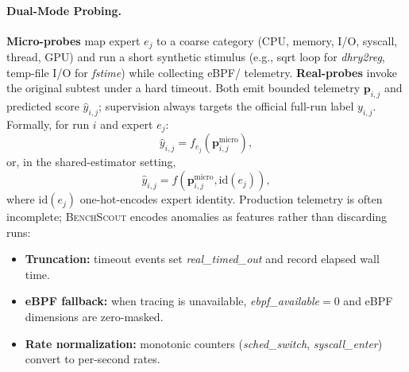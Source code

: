 \documentclass[sigplan,10pt]{acmart}
\newcommand{\ourmethod}{\textsc{BenchScout}\xspace}
\newcommand{\id}[1]{{\itshape #1}}
\begin{document}
\paragraph{Dual-Mode Probing.}
\textbf{Micro-probes} map expert $e_j$ to a coarse category (CPU, memory, I/O, syscall, thread, GPU) and run a short synthetic stimulus (e.g., sqrt loop for \id{dhry2reg}, temp-file I/O for \id{fstime}) while collecting eBPF/ telemetry.
\textbf{Real-probes} invoke the original subtest under a hard timeout.
Both emit bounded telemetry $\mathbf{p}_{i,j}$ and predicted score $\hat{y}_{i,j}$; supervision always targets the official full-run label $y_{i,j}$.
Formally, for run $i$ and expert $e_j$:
\begin{equation}
\label{eq:probe-predict}
\hat{y}_{i,j} = f_{e_j}(\mathbf{p}^{\mathrm{micro}}_{i,j}),
\end{equation}
or, in the shared-estimator setting,
\begin{equation}
\label{eq:probe-predict-shared}
\hat{y}_{i,j} = f(\mathbf{p}^{\mathrm{micro}}_{i,j}, \mathrm{id}(e_j)),
\end{equation}
where $\mathrm{id}(e_j)$ one-hot-encodes expert identity.
Production telemetry is often incomplete; \ourmethod encodes anomalies as features rather than discarding runs:
\begin{itemize}
    \item \textbf{Truncation:} timeout events set \id{real\_timed\_out} and record elapsed wall time.
    \item \textbf{eBPF fallback:} when tracing is unavailable, \id{ebpf\_available}${=}0$ and eBPF dimensions are zero-masked.
    \item \textbf{Rate normalization:} monotonic counters (\id{sched\_switch}, \id{syscall\_enter}) convert to per-second rates.
\end{itemize}
\end{document}

